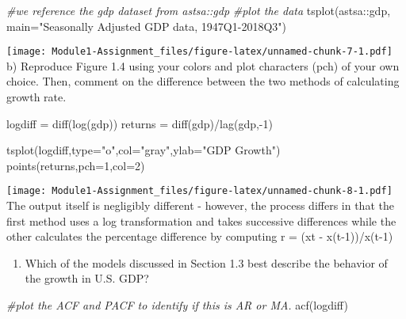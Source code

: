 \documentclass[
]{article}
\newenvironment{Shaded}{\begin{snugshade}}{\end{snugshade}}
\newcommand{\AttributeTok}[1]{\textcolor[rgb]{0.77,0.63,0.00}{#1}}
\newcommand{\CommentTok}[1]{\textcolor[rgb]{0.56,0.35,0.01}{\textit{#1}}}
\newcommand{\DecValTok}[1]{\textcolor[rgb]{0.00,0.00,0.81}{#1}}
\newcommand{\FunctionTok}[1]{\textcolor[rgb]{0.00,0.00,0.00}{#1}}
\newcommand{\NormalTok}[1]{#1}
\newcommand{\OtherTok}[1]{\textcolor[rgb]{0.56,0.35,0.01}{#1}}
\newcommand{\SpecialCharTok}[1]{\textcolor[rgb]{0.00,0.00,0.00}{#1}}
\newcommand{\StringTok}[1]{\textcolor[rgb]{0.31,0.60,0.02}{#1}}
\providecommand{\tightlist}{%
  \setlength{\itemsep}{0pt}\setlength{\parskip}{0pt}}
\begin{document}
\begin{Shaded}
\begin{Highlighting}[]
\CommentTok{\#we reference the gdp dataset from astsa::gdp }
\CommentTok{\#plot the data }
\FunctionTok{tsplot}\NormalTok{(astsa}\SpecialCharTok{::}\NormalTok{gdp, }\AttributeTok{main=}\StringTok{"Seasonally Adjusted GDP data, 1947Q1{-}2018Q3"}\NormalTok{)}
\end{Highlighting}
\end{Shaded}

\texttt{[image: Module1-Assignment\_files/figure-latex/unnamed-chunk-7-1.pdf]}
b) Reproduce Figure 1.4 using your colors and plot characters (pch) of
your own choice. Then, comment on the difference between the two methods
of calculating growth rate.

\begin{Shaded}
\begin{Highlighting}[]
\NormalTok{logdiff }\OtherTok{=} \FunctionTok{diff}\NormalTok{(}\FunctionTok{log}\NormalTok{(gdp))}
\NormalTok{returns }\OtherTok{=} \FunctionTok{diff}\NormalTok{(gdp)}\SpecialCharTok{/}\FunctionTok{lag}\NormalTok{(gdp,}\SpecialCharTok{{-}}\DecValTok{1}\NormalTok{)}

\FunctionTok{tsplot}\NormalTok{(logdiff,}\AttributeTok{type=}\StringTok{"o"}\NormalTok{,}\AttributeTok{col=}\StringTok{"gray"}\NormalTok{,}\AttributeTok{ylab=}\StringTok{"GDP Growth"}\NormalTok{)}
\FunctionTok{points}\NormalTok{(returns,}\AttributeTok{pch=}\DecValTok{1}\NormalTok{,}\AttributeTok{col=}\DecValTok{2}\NormalTok{)}
\end{Highlighting}
\end{Shaded}

\texttt{[image: Module1-Assignment\_files/figure-latex/unnamed-chunk-8-1.pdf]}
The output itself is negligibly different - however, the process differs
in that the first method uses a log transformation and takes successive
differences while the other calculates the percentage difference by
computing r = (xt - x(t-1))/x(t-1)

\begin{enumerate}
\def\labelenumi{\alph{enumi})}
\setcounter{enumi}{2}
\tightlist
\item
  Which of the models discussed in Section 1.3 best describe the
  behavior of the growth in U.S. GDP?
\end{enumerate}

\begin{Shaded}
\begin{Highlighting}[]
\CommentTok{\#plot the ACF and PACF to identify if this is AR or MA.}
\FunctionTok{acf}\NormalTok{(logdiff)}
\end{Highlighting}
\end{Shaded}
\end{document}
